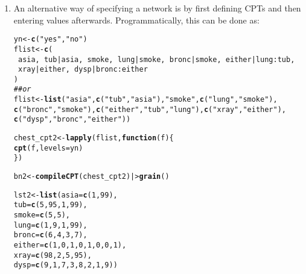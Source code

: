 \documentclass[10pt]{article}\usepackage[]{graphicx}\usepackage[]{xcolor}
\makeatletter
\newcommand{\hlnum}[1]{\textcolor[rgb]{0.686,0.059,0.569}{#1}}%
\newcommand{\hlstr}[1]{\textcolor[rgb]{0.192,0.494,0.8}{#1}}%
\newcommand{\hlcom}[1]{\textcolor[rgb]{0.678,0.584,0.686}{\textit{#1}}}%
\newcommand{\hlopt}[1]{\textcolor[rgb]{0,0,0}{#1}}%
\newcommand{\hlstd}[1]{\textcolor[rgb]{0.345,0.345,0.345}{#1}}%
\newcommand{\hlkwa}[1]{\textcolor[rgb]{0.161,0.373,0.58}{\textbf{#1}}}%
\newcommand{\hlkwb}[1]{\textcolor[rgb]{0.69,0.353,0.396}{#1}}%
\newcommand{\hlkwc}[1]{\textcolor[rgb]{0.333,0.667,0.333}{#1}}%
\newcommand{\hlkwd}[1]{\textcolor[rgb]{0.737,0.353,0.396}{\textbf{#1}}}%
\newenvironment{kframe}{%
 \def\at@end@of@kframe{}%
 \ifinner\ifhmode%
  \def\at@end@of@kframe{\end{minipage}}%
  \begin{minipage}{\columnwidth}%
 \fi\fi%
 \def\FrameCommand##1{\hskip\@totalleftmargin \hskip-\fboxsep
 \colorbox{shadecolor}{##1}\hskip-\fboxsep
     \hskip-\linewidth \hskip-\@totalleftmargin \hskip\columnwidth}%
 \MakeFramed {\advance\hsize-\width
   \@totalleftmargin\z@ \linewidth\hsize
   \@setminipage}}%
 {\par\unskip\endMakeFramed%
 \at@end@of@kframe}
\newenvironment{knitrout}{}{} %
\makeatother
\begin{document}
\begin{enumerate}
\item An alternative way of specifying a network is by first defining CPTs and then entering values afterwards. Programmatically, this can be done as:

\begin{knitrout}
\color{fgcolor}\begin{kframe}
\begin{alltt}
\hlstd{yn} \hlkwb{<-} \hlkwd{c}\hlstd{(}\hlstr{"yes"}\hlstd{,}\hlstr{"no"}\hlstd{)}
\hlstd{flist} \hlkwb{<-} \hlkwd{c}\hlstd{(}
    \hlopt{~}\hlstd{asia,} \hlopt{~}\hlstd{tub}\hlopt{|}\hlstd{asia,} \hlopt{~}\hlstd{smoke,} \hlopt{~}\hlstd{lung}\hlopt{|}\hlstd{smoke,} \hlopt{~}\hlstd{bronc}\hlopt{|}\hlstd{smoke,} \hlopt{~}\hlstd{either}\hlopt{|}\hlstd{lung}\hlopt{:}\hlstd{tub,}
    \hlopt{~}\hlstd{xray}\hlopt{|}\hlstd{either,} \hlopt{~}\hlstd{dysp}\hlopt{|}\hlstd{bronc}\hlopt{:}\hlstd{either}
\hlstd{)}
\hlcom{## or}
\hlstd{flist} \hlkwb{<-} \hlkwd{list}\hlstd{(}\hlstr{"asia"}\hlstd{,} \hlkwd{c}\hlstd{(}\hlstr{"tub"}\hlstd{,} \hlstr{"asia"}\hlstd{),} \hlstr{"smoke"}\hlstd{,} \hlkwd{c}\hlstd{(}\hlstr{"lung"}\hlstd{,} \hlstr{"smoke"}\hlstd{),}
              \hlkwd{c}\hlstd{(}\hlstr{"bronc"}\hlstd{,} \hlstr{"smoke"}\hlstd{),} \hlkwd{c}\hlstd{(}\hlstr{"either"}\hlstd{,} \hlstr{"tub"}\hlstd{,} \hlstr{"lung"}\hlstd{),} \hlkwd{c}\hlstd{(}\hlstr{"xray"}\hlstd{,} \hlstr{"either"}\hlstd{),}
              \hlkwd{c}\hlstd{(}\hlstr{"dysp"}\hlstd{,} \hlstr{"bronc"}\hlstd{,} \hlstr{"either"}\hlstd{))}

\hlstd{chest_cpt2} \hlkwb{<-} \hlkwd{lapply}\hlstd{(flist,} \hlkwa{function}\hlstd{(}\hlkwc{f}\hlstd{)\{}
    \hlkwd{cpt}\hlstd{(f,} \hlkwc{levels}\hlstd{=yn)}
\hlstd{\})}

\hlstd{bn2} \hlkwb{<-} \hlkwd{compileCPT}\hlstd{(chest_cpt2) |>} \hlkwd{grain}\hlstd{()}

\hlstd{lst2} \hlkwb{<-} \hlkwd{list}\hlstd{(}\hlkwc{asia}\hlstd{=}\hlkwd{c}\hlstd{(}\hlnum{1}\hlstd{,} \hlnum{99}\hlstd{),}
            \hlkwc{tub}\hlstd{=}\hlkwd{c}\hlstd{(}\hlnum{5}\hlstd{,} \hlnum{95}\hlstd{,} \hlnum{1}\hlstd{,} \hlnum{99}\hlstd{),}
            \hlkwc{smoke}\hlstd{=}\hlkwd{c}\hlstd{(}\hlnum{5}\hlstd{,} \hlnum{5}\hlstd{),}
            \hlkwc{lung}\hlstd{=}\hlkwd{c}\hlstd{(}\hlnum{1}\hlstd{,} \hlnum{9}\hlstd{,} \hlnum{1}\hlstd{,} \hlnum{99}\hlstd{),}
            \hlkwc{bronc}\hlstd{=}\hlkwd{c}\hlstd{(}\hlnum{6}\hlstd{,} \hlnum{4}\hlstd{,} \hlnum{3}\hlstd{,} \hlnum{7}\hlstd{),}
            \hlkwc{either}\hlstd{=}\hlkwd{c}\hlstd{(}\hlnum{1}\hlstd{,} \hlnum{0}\hlstd{,} \hlnum{1}\hlstd{,} \hlnum{0}\hlstd{,} \hlnum{1}\hlstd{,} \hlnum{0}\hlstd{,} \hlnum{0}\hlstd{,} \hlnum{1}\hlstd{),}
            \hlkwc{xray}\hlstd{=}\hlkwd{c}\hlstd{(}\hlnum{98}\hlstd{,} \hlnum{2}\hlstd{,} \hlnum{5}\hlstd{,} \hlnum{95}\hlstd{),}
            \hlkwc{dysp}\hlstd{=}\hlkwd{c}\hlstd{(}\hlnum{9}\hlstd{,} \hlnum{1}\hlstd{,} \hlnum{7}\hlstd{,} \hlnum{3}\hlstd{,} \hlnum{8}\hlstd{,} \hlnum{2}\hlstd{,} \hlnum{1}\hlstd{,} \hlnum{9}\hlstd{))}


\end{alltt}
\end{kframe}
\end{knitrout}
\end{enumerate}
\end{document}
